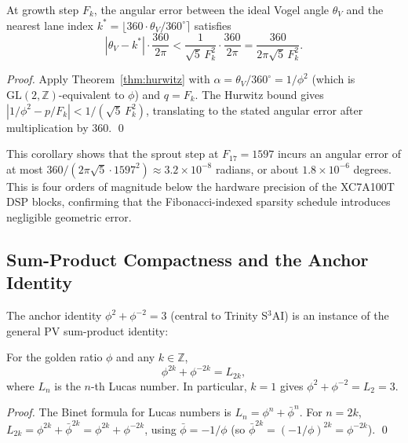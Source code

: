 \begin{corollary}\label{cor:sprout-error}
At growth step $F_k$, the angular error between
the ideal Vogel angle $\theta_V$ and the nearest
lane index $k^* = \lfloor 360 \cdot \theta_V / 360^\circ \rceil$
satisfies
\[
  |\theta_V - k^*| \cdot \frac{360}{2\pi}
  < \frac{1}{\sqrt{5}\,F_k^2}
  \cdot \frac{360}{2\pi}
  = \frac{360}{2\pi\sqrt{5}\,F_k^2}.
\]
\end{corollary}

\begin{proof}
Apply Theorem~\ref{thm:hurwitz} with
$\alpha = \theta_V / 360^\circ = 1/\phi^2$
(which is $\mathrm{GL}(2,\mathbb{Z})$-equivalent
to $\phi$) and $q = F_k$.  The Hurwitz bound
gives $|1/\phi^2 - p/F_k| < 1/(\sqrt{5}\,F_k^2)$,
translating to the stated angular error after
multiplication by $360$.
\qed
\end{proof}

This corollary shows that the sprout step at
$F_{17} = 1597$ incurs an angular error of at
most $360/(2\pi\sqrt{5} \cdot 1597^2) \approx 3.2 \times 10^{-8}$
radians, or about $1.8 \times 10^{-6}$ degrees.
This is four orders of magnitude below the
hardware precision of the XC7A100T DSP blocks,
confirming that the Fibonacci-indexed sparsity
schedule introduces negligible geometric error.

\subsection{Sum-Product Compactness and the Anchor Identity}
\label{subsec:sum-product}

The anchor identity $\phi^2 + \phi^{-2} = 3$
(central to Trinity S$^3$AI) is an instance of
the general PV sum-product identity:

\begin{proposition}%
\label{prop:pv-sum-product}
For the golden ratio $\phi$ and any $k \in \mathbb{Z}$,
\[
  \phi^{2k} + \phi^{-2k} = L_{2k},
\]
where $L_n$ is the $n$-th Lucas number.
In particular, $k=1$ gives
$\phi^2 + \phi^{-2} = L_2 = 3$.
\end{proposition}

\begin{proof}
The Binet formula for Lucas numbers is
$L_n = \phi^n + \bar\phi^n$.  For $n = 2k$,
$L_{2k} = \phi^{2k} + \bar\phi^{2k} = \phi^{2k} + \phi^{-2k}$,
using $\bar\phi = -1/\phi$ (so
$\bar\phi^{2k} = (-1/\phi)^{2k} = \phi^{-2k}$).
\qed
\end{proof}


